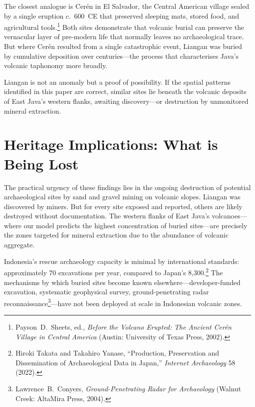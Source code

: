 \documentclass[12pt,a4paper]{article}
\begin{document}
The closest analogue is Cerén in El Salvador, the Central American village sealed by a single eruption c.~600~CE that preserved sleeping mats, stored food, and agricultural tools.\footnote{Payson~D.\ Sheets, ed., \emph{Before the Volcano Erupted: The Ancient Cer\'{e}n Village in Central America} (Austin: University of Texas Press, 2002).}
Both sites demonstrate that volcanic burial can preserve the vernacular layer of pre-modern life that normally leaves no archaeological trace.
But where Cerén resulted from a single catastrophic event, Liangan was buried by cumulative deposition over centuries---the process that characterises Java's volcanic taphonomy more broadly.

Liangan is not an anomaly but a proof of possibility.
If the spatial patterns identified in this paper are correct, similar sites lie beneath the volcanic deposits of East Java's western flanks, awaiting discovery---or destruction by unmonitored mineral extraction.


\section{Heritage Implications: What is Being Lost}

The practical urgency of these findings lies in the ongoing destruction of potential archaeological sites by sand and gravel mining on volcanic slopes.
Liangan was discovered by miners.
But for every site exposed and reported, others are likely destroyed without documentation.
The western flanks of East Java's volcanoes---where our model predicts the highest concentration of buried sites---are precisely the zones targeted for mineral extraction due to the abundance of volcanic aggregate.

Indonesia's rescue archaeology capacity is minimal by international standards: approximately 70 excavations per year, compared to Japan's 8,300.\footnote{Hiroki Takata and Takahiro Yanase, ``Production, Preservation and Dissemination of Archaeological Data in Japan,'' \emph{Internet Archaeology} 58 (2022).}
The mechanisms by which buried sites become known elsewhere---developer-funded excavation, systematic geophysical survey, ground-penetrating radar reconnaissance\footnote{Lawrence~B.\ Conyers, \emph{Ground-Penetrating Radar for Archaeology} (Walnut Creek: AltaMira Press, 2004).}---have not been deployed at scale in Indonesian volcanic zones.
\end{document}
